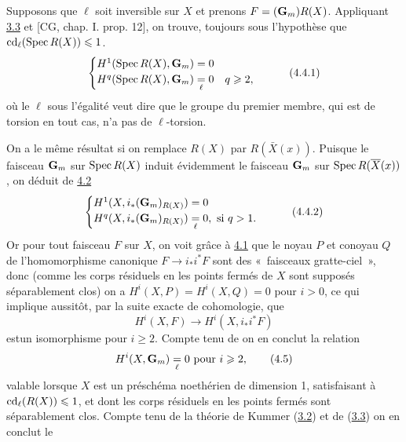 \documentclass[10pt]{../fichiers-configuration-latex/smfart}
\begin{document}
\subsection{}
Supposons que $\ell$ soit inversible sur $X$ et prenons
$F=(\mathbf{G}_m) R(X)$. Appliquant \hyperref[IX.thm3.3]{3.3} et [CG,
chap. I. prop. 12], on trouve, toujours sous l'hypothèse que
$\operatorname{cd}_{\ell}(\operatorname{Spec} R(X))\leqslant 1$.
\begin{equation*}
\begin{cases}
H^1(\operatorname{Spec} R(X), \mathbf{G}_{m})=0\\
H^q (\operatorname{Spec} R(X), \mathbf{G}_{m})\; \displaystyle{
\mathop{=}_{\ell} }\; 0\quad q\geqslant 2{},
\end{cases}\tag{4.4.1}
\end{equation*}
où le $\ell$ sous l'égalité veut dire que le groupe du premier membre,
qui est de torsion en tout cas, n'a pas de $\ell$-torsion.

On a le même résultat si on remplace $R(X)$ par
$R(\bar{X}(x))$. Puisque le faisceau $\mathbf{G}_m$ sur
$\operatorname{Spec} R(X)$ induit évidemment le faisceau $\mathbf{G}_m$ sur
$\operatorname{Spec} R(\overline{X}(x))$, on déduit de \hyperref[IX.cor4.2]{4.2}
\begin{equation*}
\begin{cases}
H^1 (X, i_{\ast}(\mathbf{G}_m)_{R(X)})=0\\
H^q (X, i_{\ast}(\mathbf{G}_m)_{R(X)})\;
\displaystyle{\mathop{=}_{\ell}}\; 0,\mbox{ si } q> 1{}.
\end{cases}\tag{4.4.2}
\end{equation*}
Or pour tout faisceau $F$ sur $X$, on voit grâce à \hyperref[IX.lem4.1]{4.1} que le noyau
$P$ et conoyau $Q$ de l'homomorphisme canonique $F\rightarrow
i_{\ast}i^{\ast}F$ sont des « faisceaux gratte-ciel », donc (comme
les corps résiduels en les points fermés de $X$ sont supposés
séparablement clos) on a $H^{i}(X,P)=H^{i}(X,Q)=0$ pour $i>0$, ce qui
implique aussitôt, par la suite exacte de cohomologie, que
$$
H^{i}(X,F)\longrightarrow H^{i}(X,i_{\ast}i^{\ast}F)
$$
est\pageoriginale un isomorphisme pour $i\geq 2$. Compte tenu de 
on en conclut la relation
\begin{equation*}
H^{i}(X,\mathbf{G}_m)\displaystyle{\mathop{\;=\;}_{\ell}}0\mbox{
pour } i\geqslant 2{},\tag{4.5}
\end{equation*}
valable lorsque $X$ est un préschéma noethérien de dimension 1,
satisfaisant à $\operatorname{cd}_{\ell}(R(X))\leqslant 1$, et dont les corps résiduels
en les points fermés sont séparablement clos. Compte tenu de la
théorie de Kummer (\hyperref[IX.Thr3.2]{3.2}) et de (\hyperref[IX.thm3.3]{3.3}) on en conclut le
\end{document}
